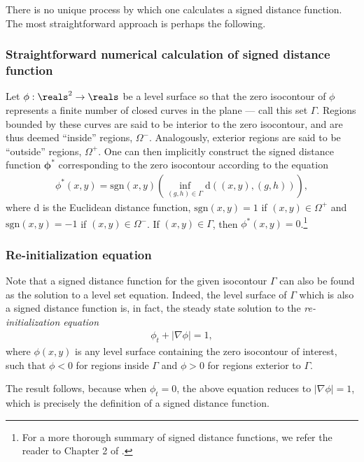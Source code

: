 \documentclass{article}
\begin{document}
There is no unique process by which one calculates a signed
distance function. The most straightforward approach is perhaps
the following. 

\subsubsection{Straightforward numerical calculation of signed distance function}
\label{sec:straight-calc-sdf}

Let $\phi: \reals^2 \to \reals$ be a level surface so that the
zero isocontour of $\phi$ represents a finite number of closed
curves in the plane --- call this set $\Gamma$. Regions bounded by
these curves are said to be interior to the zero isocontour, and
are thus deemed ``inside'' regions, $\Omega^-$. Analogously,
exterior regions are said to be ``outside'' regions,
$\Omega^+$. One can then implicitly construct the signed distance
function $\mathbf{\phi^*}$ corresponding to the zero isocontour
according to the equation
\begin{align*}
\phi^*(x,y) = \mathrm{sgn}(x,y)\left(\inf\limits_{(g,h)\in \Gamma}\mathrm{d}((x,y), (g,h))\right),
\end{align*}
where $\mathrm{d}$ is the Euclidean distance
function, $\mathrm{sgn}(x,y) = 1$ if $(x,y) \in \Omega^+$ and 
$\mathrm{sgn}(x,y) = -1$ if $(x,y) \in \Omega^-$. If $(x,y)
\in\Gamma$, then $\phi^*(x,y) = 0$.\footnote{For a more thorough
  summary of signed distance functions, we refer the reader to
  Chapter 2 of \cite{osher2003}.}

\subsubsection{Re-initialization equation}
\label{sec:rein-equat}

Note that a signed distance function for the given isocontour
$\Gamma$ can also be found as the solution to a level set
equation. Indeed, the level surface of $\Gamma$ which is also a
signed distance function is, in fact, the steady state solution to
the \emph{re-initialization equation}
\begin{align}
\label{eq:reinit}
  \phi_t + \left|\nabla\phi\right| = 1,
\end{align}
where $\phi(x,y)$ is any level surface containing the zero
isocontour of interest, such that $\phi<0$ for regions inside
$\Gamma$ and $\phi >0$ for regions exterior to $\Gamma$. 

The result follows, because when $\phi_t = 0$, the above equation
reduces to $\left|\nabla\phi\right| = 1$, which is precisely the
definition of a signed distance function.
\end{document}
